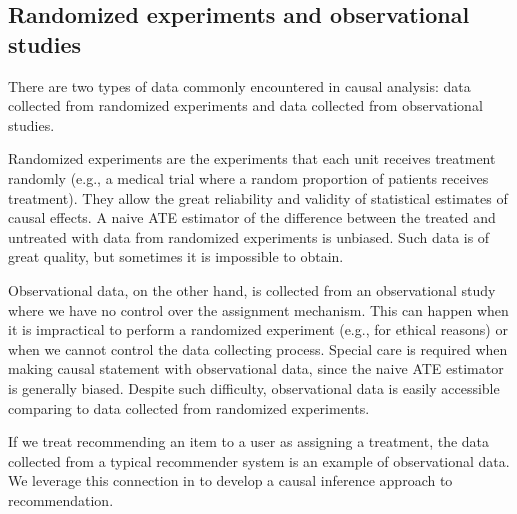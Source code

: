 \subsection{Randomized experiments and observational studies} \label{chpt:background:sec:exp_obs}


There are two types of data commonly encountered in causal analysis: data collected from randomized experiments and data collected from observational studies. 

Randomized experiments are the experiments that each unit receives treatment randomly (e.g., a medical trial where a random proportion of patients receives treatment). They allow the great reliability and validity of statistical estimates of causal effects. A naive \gls{ATE} estimator of the difference between the treated and untreated with data from randomized experiments is unbiased. Such data is of great quality, but sometimes it is impossible to obtain. 

Observational data, on the other hand, is collected from an observational study where we have no control over the assignment mechanism. This can happen when it is impractical to perform a randomized experiment (e.g., for ethical reasons) or when we cannot control the data collecting process. Special care is required when making causal statement with observational data, since the naive \gls{ATE} estimator is generally biased. Despite such difficulty, observational data is easily accessible comparing to data collected from randomized experiments.

If we treat recommending an item to a user as assigning a treatment, the data collected from a typical recommender system is an example of observational data. We leverage this connection in  to develop a causal inference approach to recommendation. 





